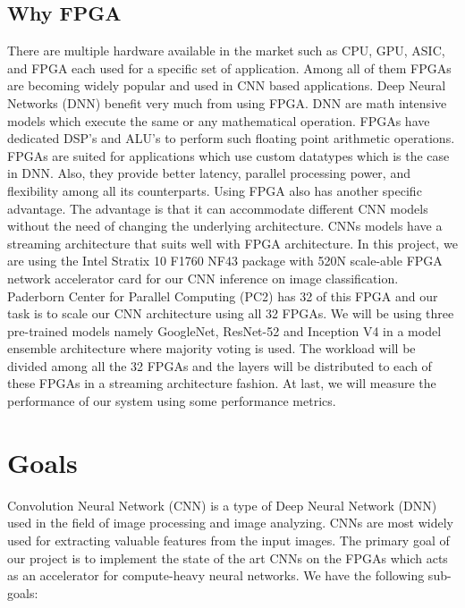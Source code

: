 \documentclass[titlepage]{report}
\begin{document}
\section{Why FPGA}
There are multiple hardware available in the market such as CPU, GPU, ASIC, and FPGA each used for a specific set of application. Among all of them FPGAs are becoming widely popular and used in CNN based applications. Deep Neural Networks (DNN) benefit very much from using FPGA. DNN are math intensive models which execute the same or any mathematical operation. FPGAs have dedicated DSP's and ALU's to perform such floating point arithmetic operations. FPGAs are suited for applications which use custom datatypes which is the case in DNN. Also, they provide better latency, parallel processing power, and flexibility among all its counterparts. Using FPGA also has another specific advantage. The advantage is that it can accommodate different CNN models without the need of changing the underlying architecture. CNNs models have a streaming architecture that suits well with FPGA architecture.
In this project, we are using the Intel Stratix 10 F1760 NF43 package with 520N scale-able FPGA network accelerator card for our CNN inference on image classification. Paderborn Center for Parallel Computing (PC2) has 32 of this FPGA and our task is to scale our CNN architecture using all 32 FPGAs. We will be using three pre-trained models namely GoogleNet, ResNet-52 and Inception V4 in a model ensemble architecture where majority voting is used. The workload will be divided among all the 32 FPGAs and the layers will be distributed to each of these FPGAs in a streaming architecture fashion. At last, we will measure the performance of our system using some performance metrics.





\chapter{Goals}
Convolution Neural Network (CNN) is a type of Deep Neural Network (DNN) used in the field of image processing and image analyzing. CNNs are most widely used for extracting valuable features from the input images. The primary goal of our project is to implement the state of the art CNNs on the FPGAs which acts as an accelerator for compute-heavy neural networks. We have the following sub-goals:
\end{document}
